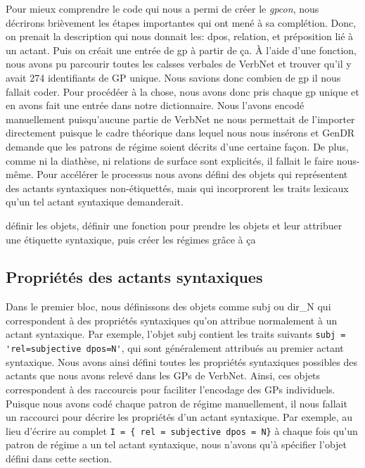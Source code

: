 Pour mieux comprendre le code qui nous a permi de créer le \emph{gpcon}, nous décrirons brièvement les étapes importantes qui ont mené à sa complétion. Donc, on prenait la description qui nous donnait les: dpos, relation, et préposition lié à un actant. Puis on créait une entrée de gp à partir de ça. À l'aide d'une fonction, nous avons pu parcourir toutes les calsses verbales de VerbNet et trouver qu'il y avait 274 identifiants de GP unique. Nous savions donc combien de gp il nous fallait coder. Pour procédéer à la chose, nous avons donc pris chaque gp unique et en avons fait une entrée dans notre dictionnaire. Nous l'avons encodé manuellement puisqu'aucune partie de VerbNet ne nous permettait de l'importer directement puisque le cadre théorique dans lequel nous nous insérons et GenDR demande que les patrons de régime soient décrits d'une certaine façon. De plus, comme ni la diathèse, ni relations de surface sont explicités, il fallait le faire nous-même. Pour accélérer le processus nous avons défini des objets qui représentent des actants syntaxiques non-étiquettés, mais qui incorprorent les traits lexicaux qu'un tel actant syntaxique demanderait.

{définir les objets, définir une fonction pour prendre les objets et leur attribuer une étiquette syntaxique, puis créer les régimes grâce à ça}

\subsection{Propriétés des actants syntaxiques}

Dans le premier bloc, nous définissons des objets comme subj ou dir\_N qui correspondent à des propriétés syntaxiques qu'on attribue normalement à un actant syntaxique. Par exemple, l'objet subj contient les traits suivants \lstinline|subj = 'rel=subjective dpos=N'|, qui sont généralement attribués au premier actant syntaxique. Nous avons ainsi défini toutes les propriétés syntaxiques possibles des actants que nous avons relevé dans les \acp{GP} de VerbNet. Ainsi, ces objets correspondent à des raccourcis pour faciliter l'encodage des \acp{GP} individuels. Puisque nous avons codé chaque patron de régime manuellement, il nous fallait un raccourci pour décrire les propriétés d'un actant syntaxique. Par exemple, au lieu d'écrire au complet \lstinline|I = { rel = subjective dpos = N}| à chaque fois qu'un patron de régime a un tel actant syntaxique, nous n'avons qu'à spécifier l'objet défini dans cette section. 

